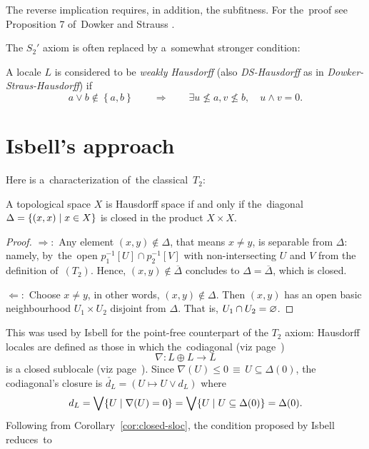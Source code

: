 \begin{rem}
  The reverse implication requires, in addition, the subfitness.
  For the~proof see Proposition 7 of~Dowker and Strauss
  \cite{ds72}.
\end{rem}

The $S_2'$ axiom is often replaced by a~somewhat stronger condition:

\begin{framed}
  \begin{df}[DS-Haus]
    A locale $L$ is considered to be \emph{weakly Hausdorff\/} (also
    \emph{DS-Hausdorff} as in \emph{Dowker-Straus-Hausdorff}) if
    \[
      a \vee b \not\in \left\{a, b\right\} \qquad \Rightarrow \qquad \exists
      u\not\leq a, v\not\leq b, \quad u \wedge v = 0.
    \]
  \end{df}
\end{framed}

\section{Isbell's approach}

Here is a~characterization of~the classical~$T_2$:

\begin{prop}
  A topological space $X$ is Hausdorff space if and only if the~diagonal
  $\Delta = \left\{(x, x) \mid x\in X \right\}$ is closed in the product
  $X\times X$.
\end{prop}

\begin{proof}
  $\Rightarrow:$ Any element $(x, y)\not\in \Delta$, that means $x \ne y$, is
  separable from $\Delta$:
  namely, by~the~open $p_1^{-1}[U] \cap p_2^{-1}[V]$ with non-intersecting $U$
  and $V$ from the definition of~$(T_2)$.
  Hence, $(x, y)\not\in \overline{\Delta}$ concludes to $\Delta =
  \overline{\Delta}$, which is closed.

  $\Leftarrow:$ Choose $x \ne y$, in other words, $(x, y)\not\in \Delta$.
  Then $(x, y)$ has an open basic neighbourhood $U_1\times U_2$ disjoint from
  $\Delta$.
  That is, $U_1 \cap U_2 = \varnothing$.
\end{proof}

This was used by Isbell \cite{isbell72} for the point-free counterpart of the
$T_2$ axiom:
Hausdorff locales are defined as those in which the~codiagonal (viz
page~\pageref{codiag-in-Frm}\thinspace)
\[
  \nabla\colon L \oplus L \to L
\]
is a closed sublocale (viz page~\pageref{df:closed-sloc}\thinspace).
Since $\nabla(U) \le 0 \, \equiv \, U \subseteq \Delta(0)$, the codiagonal's
closure is $\check{d_L} = (U \mapsto U \vee d_L)$ where
\[
  d_L
  = \bigvee \{ U \mid \nabla(U) = 0 \}
  = \bigvee \{ U \mid U \subseteq \Delta(0) \}
  = \Delta(0).
\]
Following from Corollary~\ref{cor:closed-sloc}\thinspace, the condition
proposed by Isbell reduces~to

